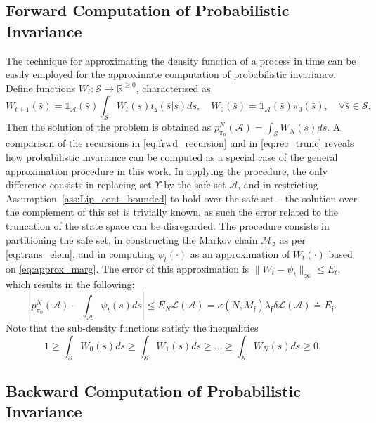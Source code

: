 \documentclass{LMCS}
\begin{document}
\subsection{Forward Computation of Probabilistic Invariance}
\label{subsec:safety_forward}
The technique for approximating the density function of a process in time can be easily employed for the approximate computation of probabilistic invariance.
Define
functions $W_t:\mathcal S\rightarrow\mathbb R^{\ge 0}$, 
characterised as 
\begin{equation}
\label{eq:frwd_recursion}
W_{t+1}(\bar s) = \mathds 1_{\mathcal A}(\bar s)\int_{\mathcal S}W_t(s)t_{\mathfrak s}(\bar s|s)ds,\quad
W_0(\bar s) = \mathds 1_{\mathcal A}(\bar s)\pi_0(\bar s), \quad \forall \bar s\in\mathcal S.
\end{equation}
Then the solution of the problem is obtained as $p_{\pi_0}^N(\mathcal A) = \int_{\mathcal S}W_N(s)ds$.
A comparison of the recursions in \eqref{eq:frwd_recursion} and in \eqref{eq:rec_trunc} reveals how probabilistic invariance can be computed as a special case of the general approximation procedure in this work.
In applying the procedure, 
the only difference consists in replacing set $\Upsilon$ by the safe set $\mathcal A$, 
and in restricting Assumption~\ref{ass:Lip_cont_bounded} to hold over the safe set -- the solution over the complement of this set is trivially known, 
as such the error related to the truncation of the state space can be disregarded.  
The procedure consists in partitioning the safe set, 
in constructing the Markov chain $\mathscr M_{\mathfrak p}$ as per \eqref{eq:trans_elem}, 
and in computing $\psi_t(\cdot)$ as an approximation of $W_t(\cdot)$ based on \eqref{eq:approx_marg}. 
The error of this approximation is $\|W_t-\psi_t\|_\infty\le E_t$, which results in the following:
\begin{equation*}
\left|p_{\pi_0}^N(\mathcal A)-\int_{\mathcal A}\psi_t(s)ds \right|\le E_N\mathcal L(\mathcal A) = \kappa(N,M_{\mathfrak f})\lambda_{\mathfrak f}\delta\mathcal L(\mathcal A)\doteq E_{\mathfrak f}.
\end{equation*}
Note that the sub-density functions satisfy the inequalities
\begin{equation*}
1\ge \int_{\mathcal S}W_0(s)ds\ge \int_{\mathcal S}W_1(s)ds\ge \ldots\ge \int_{\mathcal S}W_N(s)ds\ge 0. 
\end{equation*}

\subsection{Backward Computation of Probabilistic Invariance}
\label{subsec:safety_backward}
\end{document}
